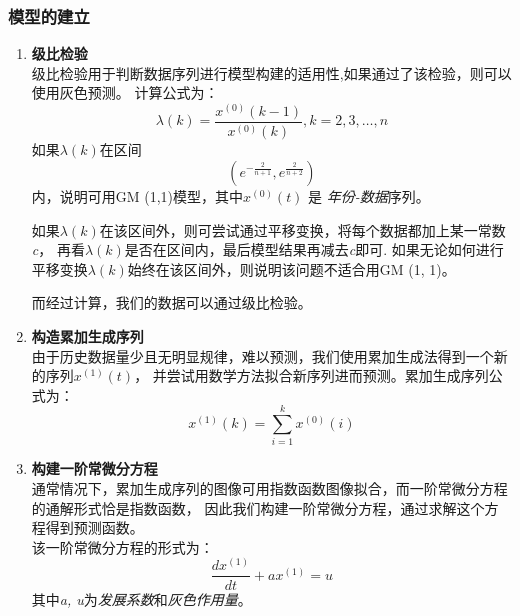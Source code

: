 \documentclass[a4paper, 12pt]{article}
\numberwithin{equation}{section}
\begin{document}
                \subsubsection{模型的建立}
                    \begin{enumerate}[(1)]
                        \item \textbf{级比检验} \\
                            级比检验用于判断数据序列进行模型构建的适用性,如果通过了该检验，则可以使用灰色预测。
                            计算公式为：
                            \begin{equation}
                                \lambda (k) = \frac{x^{ (0)} (k - 1)}{x^{ (0)} (k)}, k = 2, 3, \ldots, n
                            \end{equation}
                            如果$ \lambda (k) $在区间
                            \[ (e^{-\frac{2}{n + 1}}, e^{\frac{2}{n + 2}}) \]
                            内，说明可用GM (1,1)模型，其中$ x^{ (0)} (t) $ 是 \textit{年份-数据}序列。

                            如果$ \lambda (k) $在该区间外，则可尝试通过平移变换，将每个数据都加上某一常数\textit{c}，
                            再看$ \lambda (k) $是否在区间内，最后模型结果再减去\textit{c}即可.
                            如果无论如何进行平移变换$ \lambda (k) $始终在该区间外，则说明该问题不适合用GM (1, 1)。

                            而经过计算，我们的数据可以通过级比检验。

                        \item \textbf{构造累加生成序列} \\
                            由于历史数据量少且无明显规律，难以预测，我们使用累加生成法得到一个新的序列$ x^{ (1)} (t) $，
                            并尝试用数学方法拟合新序列进而预测。累加生成序列公式为：
                            \begin{equation}
                                x^{ (1)} (k) = \sum_{i=1}^{k} x^{ (0)} (i)
                            \end{equation}

                        \item \textbf{构建一阶常微分方程} \\
                            通常情况下，累加生成序列的图像可用指数函数图像拟合，而一阶常微分方程的通解形式恰是指数函数，
                            因此我们构建一阶常微分方程，通过求解这个方程得到预测函数。 \\
                            该一阶常微分方程的形式为：
                            \begin{equation}
                                \frac{dx^{ (1)}}{dt} + ax^{ (1)} = u
                            \end{equation}
                            其中\textit{a, u}为\textit{发展系数}和\textit{灰色作用量}。
                    \end{enumerate}
\end{document}
